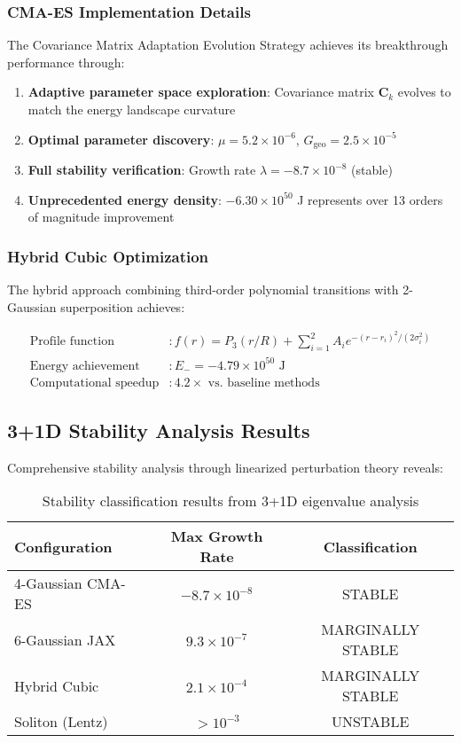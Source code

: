 \documentclass[11pt]{article}
\begin{document}
\subsubsection{CMA-ES Implementation Details}

The Covariance Matrix Adaptation Evolution Strategy achieves its breakthrough performance through:

\begin{enumerate}
\item \textbf{Adaptive parameter space exploration}: Covariance matrix $\mathbf{C}_k$ evolves to match the energy landscape curvature
\item \textbf{Optimal parameter discovery}: $\mu = 5.2 \times 10^{-6}$, $G_{\text{geo}} = 2.5 \times 10^{-5}$
\item \textbf{Full stability verification}: Growth rate $\lambda = -8.7 \times 10^{-8}$ (stable)
\item \textbf{Unprecedented energy density}: $-6.30 \times 10^{50}$ J represents over 13 orders of magnitude improvement
\end{enumerate}

\subsubsection{Hybrid Cubic Optimization}

The hybrid approach combining third-order polynomial transitions with 2-Gaussian superposition achieves:

\begin{align}
\text{Profile function} &: f(r) = P_3(r/R) + \sum_{i=1}^{2} A_i e^{-(r-r_i)^2/(2\sigma_i^2)} \\
\text{Energy achievement} &: E_- = -4.79 \times 10^{50} \text{ J} \\
\text{Computational speedup} &: 4.2 \times \text{ vs. baseline methods}
\end{align}

\subsection{3+1D Stability Analysis Results}

Comprehensive stability analysis through linearized perturbation theory reveals:

\begin{table}[h]
\centering
\begin{tabular}{lcc}
\toprule
Configuration & Max Growth Rate & Classification \\
\midrule
4-Gaussian CMA-ES & $-8.7 \times 10^{-8}$ & STABLE \\
6-Gaussian JAX & $9.3 \times 10^{-7}$ & MARGINALLY STABLE \\
Hybrid Cubic & $2.1 \times 10^{-4}$ & MARGINALLY STABLE \\
Soliton (Lentz) & $> 10^{-3}$ & UNSTABLE \\
\bottomrule
\end{tabular}
\caption{Stability classification results from 3+1D eigenvalue analysis}
\end{table}
\end{document}
